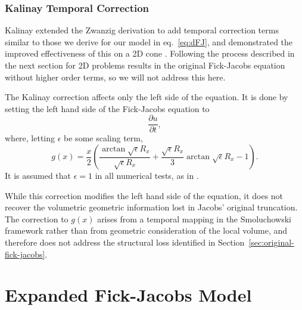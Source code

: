 \documentclass[11pt]{article}
\begin{document}

\subsubsection{Kalinay Temporal Correction}\label{sec:kalinay}

Kalinay extended the Zwanzig derivation to add temporal correction terms similar to those we derive for our model in eq.~\eqref{eq:dFJ}, and demonstrated the improved effectiveness of this on a 2D cone \cite{Kalinay2013}. Following the process described in the next section for 2D problems results in the original Fick-Jacobs equation without higher order terms, so we will not address this here.

The Kalinay correction affects only the left side of the equation. It is done by setting the left hand side of the Fick-Jacobs equation to
\begin{equation}
    [1 + \partial_x g(x)]\frac{\partial u}{\partial t},
\end{equation}
where, letting $\epsilon$ be some scaling term,
\begin{equation}
    g(x) = \frac{x}{2} \left( \frac{\arctan \sqrt{\epsilon} R_x}{\sqrt{\epsilon} R_x} + \frac{\sqrt{\epsilon} R_x}{3} \arctan \sqrt{\epsilon} R_x - 1 \right).
\end{equation}
It is assumed that $\epsilon = 1$ in all numerical tests, as in \cite{Kalinay2013}.

While this correction modifies the left hand side of the equation, it does not recover the volumetric geometric information lost in Jacobs' original truncation. The correction to $g(x)$ arises from a temporal mapping in the Smoluchowski framework rather than from geometric consideration of the local volume, and therefore does not address the structural loss identified in Section~\ref{sec:original-fick-jacobs}.



\section{Expanded Fick-Jacobs Model}
\label{sec:expanded-fick-jacobs}
\end{document}

